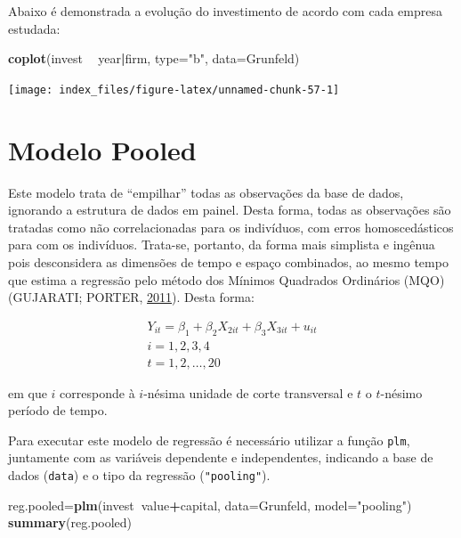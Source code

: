 \documentclass[12pt,brazil,oneside]{book}
\newenvironment{Shaded}{\begin{snugshade}}{\end{snugshade}}
\newcommand{\DataTypeTok}[1]{\textcolor[rgb]{0.13,0.29,0.53}{#1}}
\newcommand{\KeywordTok}[1]{\textcolor[rgb]{0.13,0.29,0.53}{\textbf{#1}}}
\newcommand{\NormalTok}[1]{#1}
\newcommand{\OperatorTok}[1]{\textcolor[rgb]{0.81,0.36,0.00}{\textbf{#1}}}
\newcommand{\StringTok}[1]{\textcolor[rgb]{0.31,0.60,0.02}{#1}}
\begin{document}
Abaixo é demonstrada a evolução do investimento de acordo com cada empresa estudada:

\begin{Shaded}
\begin{Highlighting}[]
\KeywordTok{coplot}\NormalTok{(invest }\OperatorTok{~}\StringTok{ }\NormalTok{year}\OperatorTok{|}\NormalTok{firm, }\DataTypeTok{type=}\StringTok{"b"}\NormalTok{, }\DataTypeTok{data=}\NormalTok{Grunfeld)}
\end{Highlighting}
\end{Shaded}

\begin{center}\texttt{[image: index\_files/figure-latex/unnamed-chunk-57-1]} \end{center}

\hypertarget{modelo-pooled}{%
\section{Modelo Pooled}\label{modelo-pooled}}

Este modelo trata de ``empilhar'' todas as observações da base de dados, ignorando a estrutura de dados em painel. Desta forma, todas as observações são tratadas como não correlacionadas para os indivíduos, com erros homoscedásticos para com os indivíduos. Trata-se, portanto, da forma mais simplista e ingênua pois desconsidera as dimensões de tempo e espaço combinados, ao mesmo tempo que estima a regressão pelo método dos Mínimos Quadrados Ordinários (MQO) (GUJARATI; PORTER, \protect\hyperlink{ref-Gujarati2011}{2011}). Desta forma:

\[
 \begin{matrix}
Y_{it} = \beta_1+\beta_2X_{2it} + \beta_3X_{3it} +u_{it}\\
i=1,2,3,4\\
t=1,2,\dots,20
 \end{matrix}
\]

em que \(i\) corresponde à \(i\)-nésima unidade de corte transversal e \(t\) o \(t\)-nésimo período de tempo.

Para executar este modelo de regressão é necessário utilizar a função \texttt{plm}, juntamente com as variáveis dependente e independentes, indicando a base de dados (\texttt{data}) e o tipo da regressão (\texttt{"pooling"}).

\begin{Shaded}
\begin{Highlighting}[]
\NormalTok{reg.pooled=}\KeywordTok{plm}\NormalTok{(invest}\OperatorTok{~}\NormalTok{value}\OperatorTok{+}\NormalTok{capital, }
               \DataTypeTok{data=}\NormalTok{Grunfeld, }\DataTypeTok{model=}\StringTok{"pooling"}\NormalTok{)}
\KeywordTok{summary}\NormalTok{(reg.pooled)}
\end{Highlighting}
\end{Shaded}
\end{document}
